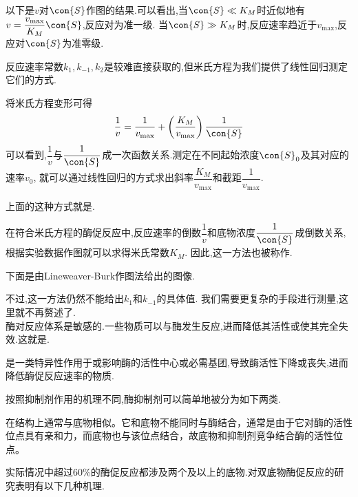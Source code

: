 \documentclass{ctexart}
\begin{document}
以下是$v$对$\con{S}$作图的结果.可以看出,当$\con{S}\ll K_M$时近似地有$v=\dfrac{v_{\max}}{K_M}\con{S}$,反应对为准一级.%
当$\con{S}\gg K_M$时,反应速率趋近于$v_{\max}$,反应对$\con{S}$为准零级.
\begin{tightcenter}
    
\end{tightcenter}
\indent 反应速率常数$k_1,k_{-1},k_2$是较难直接获取的,但米氏方程为我们提供了线性回归测定它们的方式.
\begin{derivation}
    将米氏方程变形可得
    \[\dfrac{1}{v}=\dfrac{1}{v_{\max}}+\left(\dfrac{K_M}{v_{\max}}\right)\dfrac{1}{\con{S}}\]
    可以看到,$\dfrac{1}{v}$与$\dfrac{1}{\con{S}}$成一次函数关系.测定在不同起始浓度$\con{S}_0$及其对应的速率$v_0$,%
    就可以通过线性回归的方式求出斜率$\dfrac{K_M}{v_{\max}}$和截距$\dfrac{1}{v_{\max}}$.
\end{derivation}
上面的这种方式就是.
\begin{theorem}
    在符合米氏方程的酶促反应中,反应速率的倒数$\dfrac1v$和底物浓度$\dfrac{1}{\con{S}}$成倒数关系,根据实验数据作图就可以求得米氏常数$K_M$.%
    因此,这一方法也被称作.
\end{theorem}
下面是由Lineweaver-Burk作图法给出的图像.
\begin{tightcenter}
    
\end{tightcenter}
不过,这一方法仍然不能给出$k_1$和$k_{-1}$的具体值.%
我们需要更复杂的手段进行测量,这里就不再赘述了.\vspace{4pt}\\
\indent 酶对反应体系是敏感的.一些物质可以与酶发生反应,进而降低其活性或使其完全失效.这就是.
\begin{definition}[7D.3.3 抑制剂]
    是一类特异性作用于或影响酶的活性中心或必需基团,导致酶活性下降或丧失,进而降低酶促反应速率的物质.
\end{definition}
按照抑制剂作用的机理不同,酶抑制剂可以简单地被分为如下两类.
\begin{definition}[7D.3.4 抑制剂的分类]
    在结构上通常与底物相似。它和底物不能同时与酶结合，通常是由于它对酶的活性位点具有亲和力，而底物也与该位点结合，故底物和抑制剂竞争结合酶的活性位点。
\end{definition}
\indent 实际情况中超过60\%的酶促反应都涉及两个及以上的底物.对双底物酶促反应的研究表明有以下几种机理.\\
\end{document}
